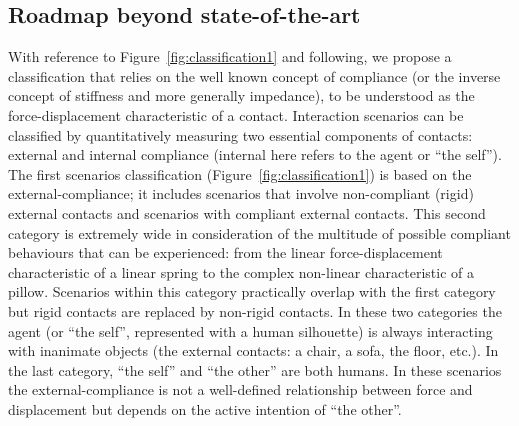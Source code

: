 \documentclass[final,5p,twocolumn]{elsarticle}
\begin{document}
\subsection{Roadmap beyond state-of-the-art}

With reference to Figure~\ref{fig:classification1} and following, we propose a classification that relies on the well known concept of compliance (or the inverse concept of stiffness and more generally impedance), to be understood as the force-displacement characteristic of a contact. Interaction scenarios can be classified by quantitatively measuring two essential components of contacts: external and internal compliance (internal here refers to the agent or ``the self''). The first scenarios classification (Figure~\ref{fig:classification1}) is based on the external-compliance; it includes scenarios that involve non-compliant (rigid) external contacts and scenarios with compliant external contacts. This second category is extremely wide in consideration of the multitude of possible compliant behaviours that can be experienced: from the linear force-displacement characteristic of a linear spring to the complex non-linear characteristic of a pillow. Scenarios within this category practically overlap with the first category but rigid contacts are replaced by non-rigid contacts. In these two categories the agent (or ``the self'', represented with a human silhouette) is always interacting with inanimate objects (the external contacts: a chair, a sofa, the floor, etc.). In the last category, ``the self'' and ``the other'' are both humans. In these scenarios the external-compliance is not a well-defined relationship between force and displacement but depends on the active intention of ``the other''.
\end{document}
